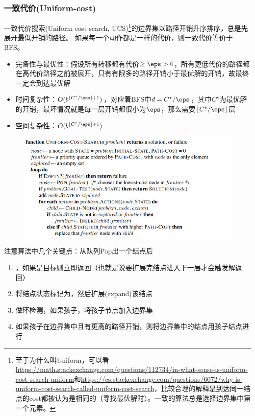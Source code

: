 \subsubsection{一致代价(Uniform-cost)}
一致代价搜索(Uniform cost search, UCS)\footnote{至于为什么叫Uniform，可以看\url{https://math.stackexchange.com/questions/112734/in-what-sense-is-uniform-cost-search-uniform}和\url{https://cs.stackexchange.com/questions/6072/why-is-uniform-cost-search-called-uniform-cost-search}，比较合理的解释是到达同一结点的cost都被认为是相同的（寻找最优解时）。一致的算法总是选择边界集中第一个元素。}的边界集以路径开销升序排序，总是先展开最低开销的路径。
如果每一个动作都是一样的代价，则一致代价等价于BFS。
\begin{itemize}
	\item 完备性与最优性：假设所有转移都有代价$\geq\eps>0$，所有更低代价的路径都在高代价路径之前被展开，只有有限多的路径开销小于最优解的开销，故最终一定会到达最优解
	\item 时间复杂性：$O(b^{\lfloor C^\star/\eps\rfloor+1})$，对应着BFS中$d=C^\star/\eps$，其中$C^\star$为最优解的开销，最坏情况就是每一层开销都很小为$\eps$，那么需要$\lfloor C^\star/\eps\rfloor$层
	\item 空间复杂性：$O(b^{\lfloor C^\star/\eps\rfloor+1})$
\end{itemize}
\begin{figure}[H]
\centering
\includegraphics[width=0.7\linewidth]{fig/UCS.png}
\end{figure}
注意算法中几个关键点：从队列Pop出一个结点后
\begin{enumerate}
	\item {}，如果是目标则立即返回（也就是说要扩展完结点进入下一层才会触发解返回）
	\item 将结点状态标记为，然后扩展(expand)该结点
	\item 做环检测，如果孩子，将孩子节点加入边界集
	\item 如果孩子在边界集中且有更高的路径开销，则将边界集中的结点用孩子结点进行
\end{enumerate}

